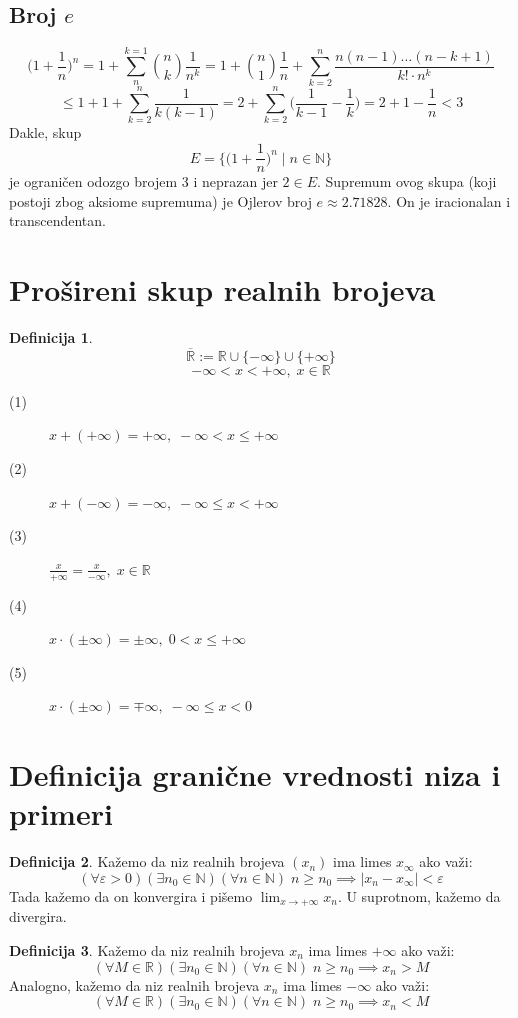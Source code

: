 \documentclass[a4paper,12pt]{article}
\theoremstyle{plain}
\theoremstyle{definition}
\newtheorem{definition}{Definicija}[section]
\theoremstyle{remark}
\begin{document}
\subsection{Broj $e$}
\label{4-3}
\[ \bigg( 1 + \frac{1}{n} \bigg)^n = 1 + \sum_{n}^{k = 1}{{n} \choose {k}} \frac{1}{n^k} = 1 + {{n} \choose 1} \frac{1}{n} + \sum_{k = 2}^{n}\frac{n(n-1)\dots (n-k+1)}{k! \cdot n^k}\]
\[\leq 1 + 1 + \sum_{k = 2}^{n} \frac{1}{k(k-1)} = 2 + \sum_{k = 2}^{n}\bigg(\frac{1}{k-1} - \frac{1}{k}\bigg) = 2 + 1 - \frac{1}{n} < 3\]
Dakle, skup \[ E = \bigg\{ \bigg( 1 + \frac{1}{n} \bigg)^n \; \bigg|\; n \in \mathbb{N} \bigg\} \] je ograničen odozgo brojem 3 i neprazan jer $2 \in E$. Supremum ovog skupa (koji postoji zbog aksiome supremuma) je Ojlerov broj $e \approx 2.71828$. On je iracionalan i transcendentan.
 
\newpage
\section{Prošireni skup realnih brojeva}
\begin{definition}
    \[ \overline{\mathbb{R}} := \mathbb{R} \cup \{-\infty\} \cup \{+\infty\} \]
    \[ -\infty < x < +\infty, \; x \in \mathbb{R} \]
\end{definition}

\begin{description}
    \item[(1)] $x + (+ \infty) = + \infty, \; -\infty < x \leq +\infty$
    \item[(2)] $x + (- \infty) = -\infty, \; -\infty \leq x < +\infty$
    \item[(3)] $\frac{x}{+\infty} = \frac{x}{-\infty},\; x \in \mathbb{R}$
    \item[(4)] $x \cdot (\pm \infty) = \pm \infty,\; 0 < x \leq +\infty$  
    \item[(5)] $x \cdot (\pm \infty) = \mp \infty, \; -\infty \leq x < 0$
\end{description}

\section{Definicija granične vrednosti niza i primeri}
\begin{definition}
    Kažemo da niz realnih brojeva $(x_n)$ ima limes $x_\infty$ ako važi:
    \[ (\forall \varepsilon > 0)(\exists n_0 \in \mathbb{N})(\forall n \in \mathbb{N}) \; n \geq n_0 \implies |x_n - x_\infty| < \varepsilon \]
    Tada kažemo da on konvergira i pišemo $\lim_{x \to +\infty} x_n$. U suprotnom, kažemo da divergira.
\end{definition}
\begin{definition}
    Kažemo da niz realnih brojeva $x_n$ ima limes $+\infty$ ako važi:
    \[ (\forall M \in \mathbb{R})(\exists n_0 \in \mathbb{N})(\forall n \in \mathbb{N}) \; n \geq n_0 \implies x_n > M \]
    Analogno, kažemo da niz realnih brojeva $x_n$ ima limes $-\infty$ ako važi:
    \[ (\forall M \in \mathbb{R})(\exists n_0 \in \mathbb{N})(\forall n \in \mathbb{N}) \; n \geq n_0 \implies x_n < M \]
\end{definition}
\end{document}
